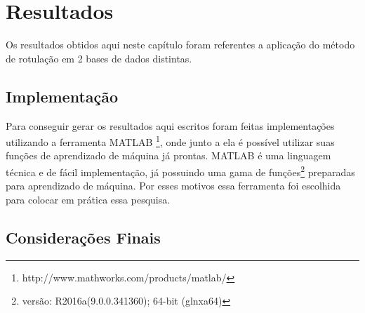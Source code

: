 \chapter{Resultados}\label{cap:resultados}

Os resultados obtidos aqui neste capítulo foram referentes a aplicação do método de rotulação em 2 bases de dados distintas. 


\section{Implementação}

Para conseguir gerar os resultados aqui escritos foram feitas implementações utilizando a ferramenta MATLAB \footnote{http://www.mathworks.com/products/matlab/}, onde junto  a ela é possível utilizar suas funções de aprendizado de máquina já prontas. MATLAB é uma linguagem técnica e de fácil implementação, já possuindo uma gama de funções\footnote{versão: R2016a(9.0.0.341360); 64-bit (glnxa64)} preparadas para aprendizado de máquina. Por esses motivos essa ferramenta foi escolhida para colocar em prática essa pesquisa.



\section{Considerações Finais}

\lipsum[74]
